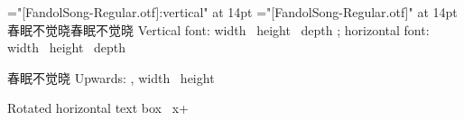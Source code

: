 \documentclass{article}
\begin{document}
\font\vf="[FandolSong-Regular.otf]:vertical" at 14pt
\font\hf="[FandolSong-Regular.otf]" at 14pt
\hbox{\vf 春眠不觉晓}\hbox{\hf 春眠不觉晓}
Vertical font: width \the{}\ height \the{}\ depth \the{}; horizontal font: width \the{}\ height \the{}\ depth \the{}\par
{}
\hbox{\vf 春眠不觉晓}
Upwards: \the\XeTeXupwardsmode, width \the{}\ height \the{}\par
{}
 \par
{}\hbox{}Rotated horizontal text box \the{}\ x\the{}+\the{}\par
\end{document}
